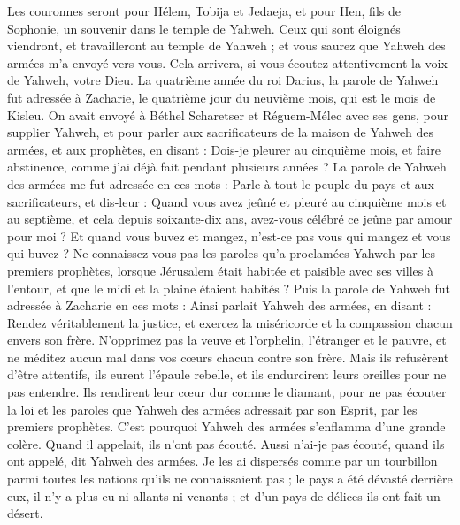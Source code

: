 \begin{multicols}{2}
Les couronnes seront pour Hélem, Tobija et Jedaeja, et pour Hen, fils de Sophonie, un souvenir dans le temple de Yahweh.
Ceux qui sont éloignés viendront, et travailleront au temple de Yahweh ; et vous saurez que Yahweh des armées m'a envoyé vers vous. Cela arrivera, si vous écoutez attentivement la voix de Yahweh, votre Dieu.
\VerseOne{}La quatrième année du roi Darius, la parole de Yahweh fut adressée à Zacharie, le quatrième jour du neuvième mois, qui est le mois de Kisleu.
On avait envoyé à Béthel Scharetser et Réguem-Mélec avec ses gens, pour supplier Yahweh,
et pour parler aux sacrificateurs de la maison de Yahweh des armées, et aux prophètes, en disant : Dois-je pleurer au cinquième mois, et faire abstinence, comme j'ai déjà fait pendant plusieurs années ?
La parole de Yahweh des armées me fut adressée en ces mots :
Parle à tout le peuple du pays et aux sacrificateurs, et dis-leur : Quand vous avez jeûné et pleuré au cinquième mois et au septième, et cela depuis soixante-dix ans, avez-vous célébré ce jeûne par amour pour moi ?
Et quand vous buvez et mangez, n'est-ce pas vous qui mangez et vous qui buvez ?
Ne connaissez-vous pas les paroles qu’a proclamées Yahweh par les premiers prophètes, lorsque Jérusalem était habitée et paisible avec ses villes à l’entour, et que le midi et la plaine étaient habités ?
Puis la parole de Yahweh fut adressée à Zacharie en ces mots :
Ainsi parlait Yahweh des armées, en disant : Rendez véritablement la justice, et exercez la miséricorde et la compassion chacun envers son frère.
N’opprimez pas la veuve et l'orphelin, l'étranger et le pauvre, et ne méditez aucun mal dans vos cœurs chacun contre son frère.
Mais ils refusèrent d’être attentifs, ils eurent l'épaule rebelle, et ils endurcirent leurs oreilles pour ne pas entendre.
Ils rendirent leur cœur dur comme le diamant, pour ne pas écouter la loi et les paroles que Yahweh des armées adressait par son Esprit, par les premiers prophètes. C’est pourquoi  Yahweh des armées s’enflamma d’une grande colère.
Quand il appelait, ils n'ont pas écouté. Aussi n’ai-je pas écouté, quand ils ont appelé, dit Yahweh des armées.
Je les ai dispersés comme par un tourbillon parmi toutes les nations qu'ils ne connaissaient pas ; le pays a été dévasté derrière eux, il n’y a plus eu ni allants ni venants ; et d’un pays de délices ils ont fait un désert.

\end{multicols}
